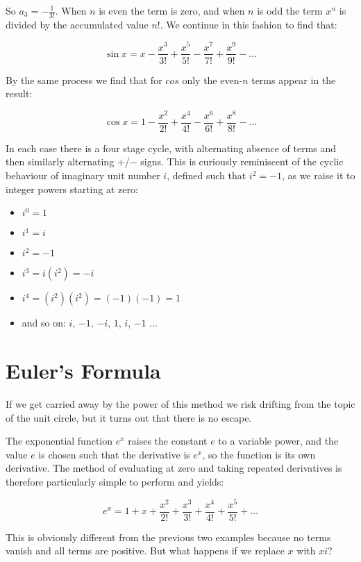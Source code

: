 So $a_3 = -\frac{1}{3!}$. When $n$ is even the term is zero, and when $n$ is odd the term $x^n$ is divided by the accumulated value $n!$. We continue in this fashion to find that:

$$
\sin x = x - \frac{x^3}{3!} + \frac{x^5}{5!} - \frac{x^7}{7!} + \frac{x^9}{9!} - \ldots
$$

By the same process we find that for $cos$ only the even-$n$ terms appear in the result:

$$
\cos x = 1 - \frac{x^2}{2!} + \frac{x^4}{4!} - \frac{x^6}{6!} + \frac{x^8}{8!} - \ldots
$$

In each case there is a four stage cycle, with alternating absence of terms and then similarly alternating $+$/$-$ signs. This is curiously reminiscent of the cyclic behaviour of imaginary unit number $i$, defined such that $i^2 = -1$, as we raise it to integer powers starting at zero:

\begin{itemize}
    \item $i^0 = 1$
    \item $i^1 = i$
    \item $i^2 = -1$
    \item $i^3 = i(i^2) = -i$
    \item $i^4 = (i^2)(i^2) = (-1)(-1) = 1$
    \item and so on: $i$, $-1$, $-i$, $1$, $i$, $-1$ $\ldots$
\end{itemize}

\section{Euler's Formula}

If we get carried away by the power of this method we risk drifting from the topic of the unit circle, but it turns out that there is no escape.

The exponential function $e^x$ raises the constant $e$ to a variable power, and the value $e$ is chosen such that the derivative is $e^x$, so the function is its own derivative. The method of evaluating at zero and taking repeated derivatives is therefore particularly simple to perform and yields:

$$
e^x = 1 + x + \frac{x^2}{2!} + \frac{x^3}{3!} + \frac{x^4}{4!} + \frac{x^5}{5!} + \ldots
$$

This is obviously different from the previous two examples because no terms vanish and all terms are positive. But what happens if we replace $x$ with $xi$?

